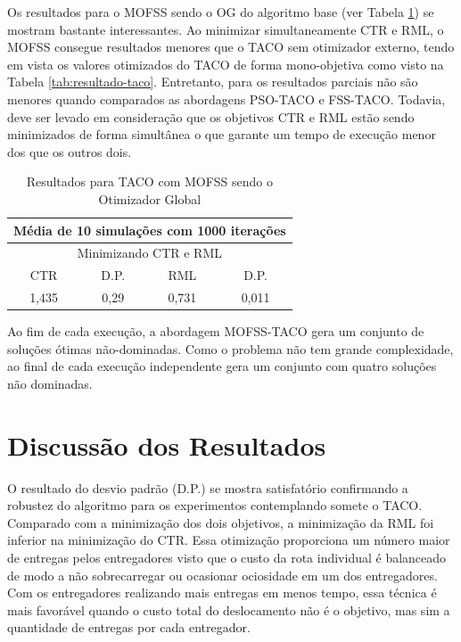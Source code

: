 Os resultados para o MOFSS sendo o OG do algoritmo base (ver Tabela \ref{tab:resultado-mofss}) se mostram bastante interessantes. Ao minimizar simultaneamente CTR e RML, o MOFSS consegue resultados menores que o TACO sem otimizador externo, tendo em vista os valores otimizados do TACO de forma mono-objetiva como visto na Tabela \ref{tab:resultado-taco}. Entretanto, para os resultados parciais não são menores quando comparados as abordagens PSO-TACO e FSS-TACO. Todavia, deve ser levado em consideração que os objetivos CTR e RML estão sendo minimizados de forma simultânea o que garante um tempo de execução menor dos que os outros dois.

\begin{table}[htb]
    \centering
    \caption{Resultados para TACO com MOFSS sendo o Otimizador Global} \label{tab:resultado-mofss}
    \begin{tabular}{|c|c|c|c|}
    \hline
    \multicolumn{4}{|c|}{Média de 10 simulações com 1000 iterações} \\ \hline
    \multicolumn{4}{|c|}{Minimizando CTR e RML}                     \\ \hline
    CTR            & D.P.          & RML            & D.P.          \\ \hline
    1,435          & 0,29          & 0,731          & 0,011         \\ \hline
    \end{tabular}
    \end{table}

Ao fim de cada execução, a abordagem MOFSS-TACO gera um conjunto de soluções ótimas não-dominadas. Como o problema não tem grande complexidade, ao final de cada execução independente gera um conjunto com quatro soluções não dominadas.

\section{Discussão dos Resultados}

O resultado do desvio padrão (D.P.) se mostra satisfatório confirmando a robustez do algoritmo para os experimentos contemplando somete o TACO. Comparado com a minimização dos dois objetivos, a minimização da RML foi inferior na minimização do CTR. Essa otimização proporciona um número maior de entregas pelos entregadores visto que o custo da rota individual é balanceado de modo a não sobrecarregar ou ocasionar ociosidade em um dos entregadores. Com os entregadores realizando mais entregas em menos tempo, essa técnica é mais favorável quando o custo total do deslocamento não é o objetivo, mas sim a quantidade de entregas por cada entregador.

